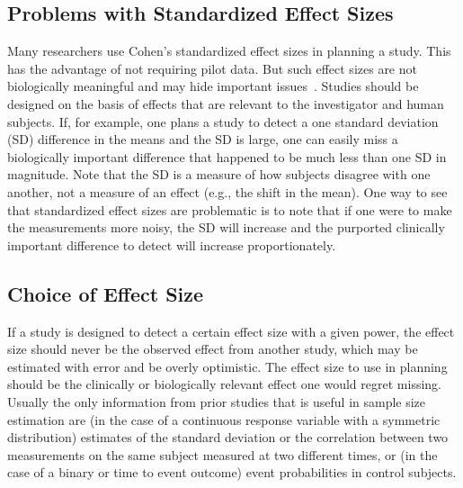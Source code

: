 \subsection{Problems with Standardized Effect Sizes}
Many researchers use Cohen's standardized effect sizes in planning a
study. This has the advantage of not requiring pilot data. But such
effect sizes are not biologically meaningful and may hide important
issues~\cite{len01som}. Studies should be designed on the basis
of effects that are relevant to the investigator and human
subjects. If, for example, one plans a study to detect a one standard
deviation (SD) difference in the means and the SD is large, one can
easily miss a biologically important difference that happened to be
much less than one SD in magnitude. Note that the SD is a measure of
how subjects disagree with one another, not a measure of an effect
(e.g., the shift in the mean).  One way to see that standardized
effect sizes are problematic is to note that if one were to make the
measurements more noisy, the SD will increase and the purported
clinically important difference to detect will increase proportionately.

\subsection{Choice of Effect Size}
If a study is designed to detect a certain effect size with a given
power, the effect size should never be the observed effect from
another study, which may be estimated with error and be overly
optimistic. The effect size to use in planning should be the
clinically or biologically relevant effect one would regret
missing.  Usually the only information from prior studies that is
useful in sample size estimation are (in the case of a continuous
response variable with a symmetric distribution) estimates of the
standard deviation or the correlation between two measurements on the
same subject measured at two different times, or (in the case of a
binary or time to event outcome) event probabilities in control
subjects. 

